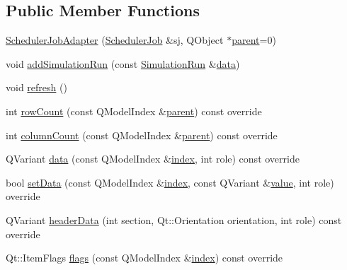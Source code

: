 \subsection*{Public Member Functions}
\begin{DoxyCompactItemize}
\item 
\mbox{\hyperlink{class_scheduler_job_adapter_a7c4dbb5add89d445a8bc986ff6a96c86}{Scheduler\+Job\+Adapter}} (\mbox{\hyperlink{class_scheduler_job}{Scheduler\+Job}} \&sj, Q\+Object $\ast$\mbox{\hyperlink{class_scheduler_job_adapter_a6b0a7aa25fc5c69078275fea2a0fa5c2}{parent}}=0)
\item 
void \mbox{\hyperlink{class_scheduler_job_adapter_a7bb95e3cb4df8be85706f3cd8f263b7b}{add\+Simulation\+Run}} (const \mbox{\hyperlink{class_simulation_run}{Simulation\+Run}} \&\mbox{\hyperlink{class_scheduler_job_adapter_aaaa7942a0fbbe22ab8400cc0d355e884}{data}})
\item 
void \mbox{\hyperlink{class_scheduler_job_adapter_a200d0e6c6d7c1aeac93a70a1d8ef9916}{refresh}} ()
\item 
int \mbox{\hyperlink{class_scheduler_job_adapter_a68ded1742c1fabad7bf1a635f401b355}{row\+Count}} (const Q\+Model\+Index \&\mbox{\hyperlink{class_scheduler_job_adapter_a6b0a7aa25fc5c69078275fea2a0fa5c2}{parent}}) const override
\item 
int \mbox{\hyperlink{class_scheduler_job_adapter_a641b222682c8a320db17a845aab76969}{column\+Count}} (const Q\+Model\+Index \&\mbox{\hyperlink{class_scheduler_job_adapter_a6b0a7aa25fc5c69078275fea2a0fa5c2}{parent}}) const override
\item 
Q\+Variant \mbox{\hyperlink{class_scheduler_job_adapter_aaaa7942a0fbbe22ab8400cc0d355e884}{data}} (const Q\+Model\+Index \&\mbox{\hyperlink{class_scheduler_job_adapter_a8f6d139992581af9639b7d0e6e418219}{index}}, int role) const override
\item 
bool \mbox{\hyperlink{class_scheduler_job_adapter_a25cab29447458f66d2474edf2d0060a6}{set\+Data}} (const Q\+Model\+Index \&\mbox{\hyperlink{class_scheduler_job_adapter_a8f6d139992581af9639b7d0e6e418219}{index}}, const Q\+Variant \&\mbox{\hyperlink{diffusion_8cpp_a4b41795815d9f3d03abfc739e666d5da}{value}}, int role) override
\item 
Q\+Variant \mbox{\hyperlink{class_scheduler_job_adapter_a75ab2de576527f254ee85b9b4e618e37}{header\+Data}} (int section, Qt\+::\+Orientation orientation, int role) const override
\item 
Qt\+::\+Item\+Flags \mbox{\hyperlink{class_scheduler_job_adapter_ac0b711328d73901be03ae9e381493c0c}{flags}} (const Q\+Model\+Index \&\mbox{\hyperlink{class_scheduler_job_adapter_a8f6d139992581af9639b7d0e6e418219}{index}}) const override

\end{DoxyCompactItemize}
